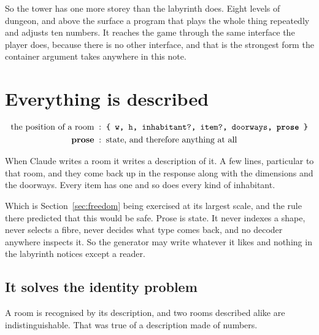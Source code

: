 \documentclass[11pt,a4paper]{article}
\begin{document}
\begin{sectionbox}
So the tower has one more storey than the labyrinth does. Eight levels of dungeon, and above the
surface a program that plays the whole thing repeatedly and adjusts ten numbers. It reaches the
game through the same interface the player does, because there is no other interface, and that
is the strongest form the container argument takes anywhere in this note.
\end{sectionbox}

\newpage

\newpage

\section{Everything is described}
\label{sec:descr}

\begin{center}
\begin{tcolorbox}[plainbg, colback=pale, width=0.9\textwidth]
\begin{align*}
\text{the position of a room} \;&:\; \texttt{\{ w, h, inhabitant?, item?, doorways, \textbf{prose} \}} \\
\textbf{prose} \;&:\; \text{state, and therefore anything at all}
\end{align*}
\end{tcolorbox}
\end{center}

When Claude writes a room it writes a description of it. A few lines, particular to that room, and
they come back up in the response along with the dimensions and the doorways. Every item has one and
so does every kind of inhabitant.

\begin{sectionbox}
Which is Section~\ref{sec:freedom} being exercised at its largest scale, and the rule there
predicted that this would be safe. Prose is state. It never indexes a shape, never selects a fibre,
never decides what type comes back, and no decoder anywhere inspects it. So the generator may write
whatever it likes and nothing in the labyrinth notices except a reader.
\end{sectionbox}

\subsection{It solves the identity problem}

A room is recognised by its description, and two rooms described alike are indistinguishable. That was true of a description made of numbers.
\end{document}
